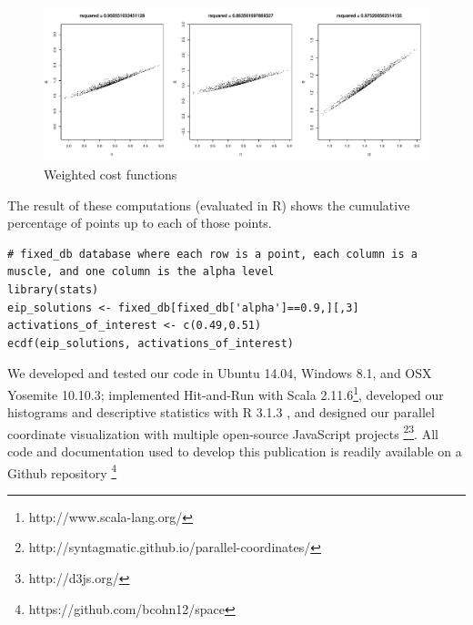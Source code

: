 \begin{figure}[h]
\centering
\includegraphics[width=\textwidth,page=2]{figs/cost_function_scatterplots.pdf}
\caption{Weighted cost functions}
\label{fig:weighted_cost_functions}
\end{figure}
The result of these computations (evaluated in R) shows the cumulative percentage of points up to each of those points.
\begin{verbatim}
# fixed_db database where each row is a point, each column is a muscle, and one column is the alpha level
library(stats)
eip_solutions <- fixed_db[fixed_db['alpha']==0.9,][,3]
activations_of_interest <- c(0.49,0.51)
ecdf(eip_solutions, activations_of_interest)
\end{verbatim}

We developed and tested our code in  Ubuntu 14.04, Windows 8.1, and OSX Yosemite 10.10.3; implemented Hit-and-Run with Scala 2.11.6\footnote{http://www.scala-lang.org/}, developed our histograms and descriptive statistics with R 3.1.3 \cite{rCoreCitation}, and designed our parallel coordinate visualization with multiple open-source JavaScript projects \footnote{http://syntagmatic.github.io/parallel-coordinates/}\footnote{http://d3js.org/}.
All code and documentation used to develop this publication is readily available on a Github repository \footnote{https://github.com/bcohn12/space}
